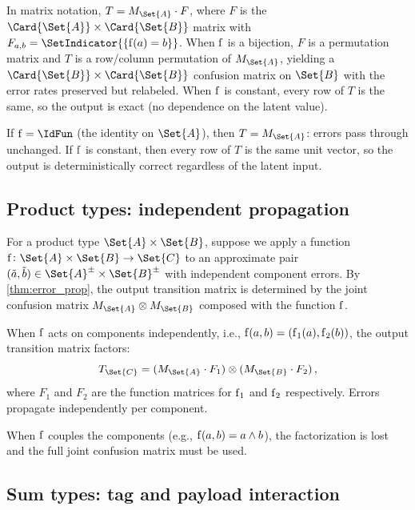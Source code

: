 \documentclass[ ../main.tex]{subfiles}
\begin{document}
In matrix notation, $T = M_{\Set{A}} \cdot F$, where $F$ is the $\Card{\Set{A}} \times \Card{\Set{B}}$ matrix with $F_{a, b} = \SetIndicator{\{\Fun{f}(a) = b\}}$.
When $\Fun{f}$ is a bijection, $F$ is a permutation matrix and $T$ is a row/column permutation of $M_{\Set{A}}$, yielding a $\Card{\Set{B}} \times \Card{\Set{B}}$ confusion matrix on $\Set{B}$ with the error rates preserved but relabeled.
When $\Fun{f}$ is constant, every row of $T$ is the same, so the output is exact (no dependence on the latent value).

\begin{corollary}
\label{cor:id_const}
If $\Fun{f} = \IdFun$ (the identity on $\Set{A}$), then $T = M_{\Set{A}}$: errors pass through unchanged.
If $\Fun{f}$ is constant, then every row of $T$ is the same unit vector, so the output is deterministically correct regardless of the latent input.
\end{corollary}

\subsection{Product types: independent propagation}

For a product type $\Set{A} \times \Set{B}$, suppose we apply a function $\Fun{f} \colon \Set{A} \times \Set{B} \to \Set{C}$ to an approximate pair $(\tilde{a}, \tilde{b}) \in \AT{\Set{A}} \times \AT{\Set{B}}$ with independent component errors.
By \cref{thm:error_prop}, the output transition matrix is determined by the joint confusion matrix $M_{\Set{A}} \otimes M_{\Set{B}}$ composed with the function $\Fun{f}$.

When $\Fun{f}$ acts on components independently, i.e., $\Fun{f}(a, b) = (\Fun{f}_1(a), \Fun{f}_2(b))$, the output transition matrix factors:
\begin{equation}
T_{\Set{C}} = (M_{\Set{A}} \cdot F_1) \otimes (M_{\Set{B}} \cdot F_2)\,,
\end{equation}
where $F_1$ and $F_2$ are the function matrices for $\Fun{f}_1$ and $\Fun{f}_2$ respectively.
Errors propagate independently per component.

When $\Fun{f}$ couples the components (e.g., $\Fun{f}(a, b) = a \wedge b$), the factorization is lost and the full joint confusion matrix must be used.

\subsection{Sum types: tag and payload interaction}
\end{document}
